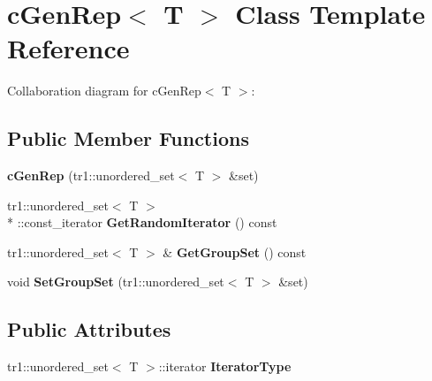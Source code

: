 \hypertarget{classcGenRep}{\section{c\-Gen\-Rep$<$ T $>$ Class Template Reference}
\label{classcGenRep}
}


Collaboration diagram for c\-Gen\-Rep$<$ T $>$\-:
\subsection*{Public Member Functions}
\begin{DoxyCompactItemize}
\item 
\hypertarget{classcGenRep_afc45eb5aac4afa26288e4ef1b6dc3c52}{{\bfseries c\-Gen\-Rep} (tr1\-::unordered\-\_\-set$<$ T $>$ \&set)}\label{classcGenRep_afc45eb5aac4afa26288e4ef1b6dc3c52}

\item 
\hypertarget{classcGenRep_afb8d7535bcd9e4fda83eceb2a2633c2c}{tr1\-::unordered\-\_\-set$<$ T $>$\\*
\-::const\-\_\-iterator {\bfseries Get\-Random\-Iterator} () const }\label{classcGenRep_afb8d7535bcd9e4fda83eceb2a2633c2c}

\item 
\hypertarget{classcGenRep_aa94ce954bd3a2aabaa54d46642141df9}{tr1\-::unordered\-\_\-set$<$ T $>$ \& {\bfseries Get\-Group\-Set} () const }\label{classcGenRep_aa94ce954bd3a2aabaa54d46642141df9}

\item 
\hypertarget{classcGenRep_a38819c49300c51669a631399302ea130}{void {\bfseries Set\-Group\-Set} (tr1\-::unordered\-\_\-set$<$ T $>$ \&set)}\label{classcGenRep_a38819c49300c51669a631399302ea130}

\end{DoxyCompactItemize}
\subsection*{Public Attributes}
\begin{DoxyCompactItemize}
\item 
\hypertarget{classcGenRep_a94b066c9b99401b112085195c278b827}{tr1\-::unordered\-\_\-set$<$ T $>$\-::iterator {\bfseries Iterator\-Type}}\label{classcGenRep_a94b066c9b99401b112085195c278b827}

\end{DoxyCompactItemize}
